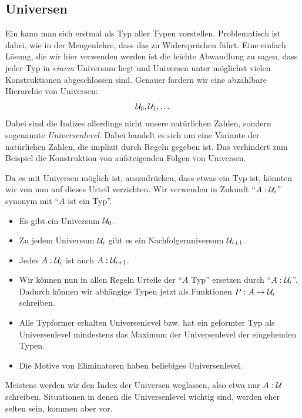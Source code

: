 \subsection{Universen}
Ein  kann man sich erstmal als Typ aller Typen vorstellen.
Problematisch ist dabei, wie in der Mengenlehre, dass das zu Widersprüchen führt.
Eine einfach Lösung, die wir hier verwenden werden ist die leichte Abwandlung zu sagen, dass jeder Typ in \emph{einem} Universum liegt und Universen unter möglichst vielen Konstruktionen abgeschlossen sind.
Genauer fordern wir eine abzählbare Hierarchie von Universen:
\[
  \mathcal{U}_0, \mathcal{U}_1, \dots
\]
Dabei sind die Indizes allerdings nicht unsere natürlichen Zahlen, sondern sogenannte \emph{Universenlevel}.
Dabei handelt es sich um eine Variante der natürlichen Zahlen, die implizit durch Regeln gegeben ist.
Das verhindert zum Beispiel die Konstruktion von aufsteigenden Folgen von Universen.

Da es mit Universen möglich ist, auszudrücken, dass etwas ein Typ ist, könnten wir von nun auf dieses Urteil verzichten.
Wir verwenden in Zukunft ``$A:\mathcal{U}_i$'' synonym mit ``$A$ ist ein Typ''.

\begin{regeln}
\begin{itemize}
\item Es gibt ein Universum $\mathcal{U}_0$.
\item Zu jedem Universum $\mathcal{U}_i$ gibt es ein Nachfolgeruniversum $\mathcal{U}_{i+1}$.
\item Jedes $A:\mathcal{U}_i$ ist auch $A:\mathcal{U}_{i+1}$.
\item Wir können nun in allen Regeln Urteile der ``$A$ Typ'' ersetzen durch ``$A:\mathcal{U}_i$''.
  Dadurch können wir abhängige Typen jetzt als Funktionen $P:A\to\mathcal{U}_i$ schreiben.
\item Alle Typformer erhalten Universenlevel bzw. hat ein geformter Typ als Universenlevel mindestens das Maximum der Universenlevel der eingehenden Typen.
\item Die Motive von Eliminatoren haben beliebiges Universenlevel.
\end{itemize}
\end{regeln}

\begin{konvention}
  Meistens werden wir den Index der Universen weglassen, also etwa nur $A:\mathcal{U}$ schreiben.
  Situationen in denen die Universenlevel wichtig sind, werden eher selten sein, kommen aber vor.
\end{konvention}

